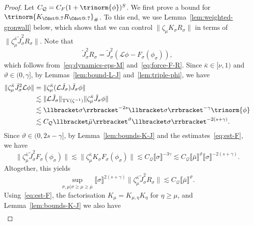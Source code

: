 \documentclass{article}
\makeatletter
\numberwithin{equation}{section}
\newcommand*\Cdot{{\mathpalette\Cdot@{.7}}}
\newcommand*\Cdot@[2]{\mathbin{\vcenter{\hbox{\scalebox{#2}{\hspace{0.1mm}$\m@th#1\bullet$\hspace{0.1mm}}}}}}
\theoremstyle{plain}
\theoremstyle{definition}
\makeatother
\begin{document}
\begin{proof}
  Let $C_{\mathcal{Q}} = C_F (1 + \trinorm{ \phi })^S$. We first
  prove a bound for $\trinorm{ K_{\Cdot} R_{\Cdot} }_{\#}$. To
  this end, we use Lemma~\ref{lem:weighted-gronwall} below, which shows that
  we can control $\| \zeta_{\mu} K_{\sigma} R_{\sigma} \|$ in terms of $\|
  \zeta_{\mu}^{\bar{\kappa}} \tilde{J}_{\sigma}^2 R_{\sigma} \|$. Note that
  \[ \tilde{J}_{\sigma}^2 R_{\sigma} = \tilde{J}_{\sigma}^2 (\mathcal{L} \phi
     - F_{\sigma} (\phi_{\sigma})), \]
  which follows from~\eqref{eq:dynamics-eps-M} and~\eqref{eq:force-F-R}. Since
  $\bar{\kappa} \in [\nu, 1)$ and $\vartheta \in (0, \gamma]$, by
  Lemmas~\ref{lem:bound-L-J} and~\ref{lem:triple-phi}, we have
  \begin{align*}
    \| \zeta_{\mu}^{\bar{\kappa}} \tilde{J}_{\sigma}^2
    \mathcal{L} \phi \|
    &= \| \zeta_{\mu}^{\bar{\kappa}}
    (\mathcal{L} \tilde{J}_{\sigma})
    \tilde{J}_{\sigma} \phi \|\\
    &\lesssim \| \mathcal{L} \tilde{J}_{\sigma}
    \|_{\operatorname{TV}(\zeta^{- 1})}
    \| \zeta_{\mu}^{\bar{\kappa}}
    \tilde{J}_{\sigma} \phi \|\\
    &\lesssim \llbracket \sigma \rrbracket^{- 2 s}
    \llbracket \sigma \rrbracket^{- \gamma}
    \trinorm{ \phi }\\
    &\lesssim C_{\mathcal{Q}}
    \llbracket \bar{\mu} \rrbracket^{\vartheta}
    \llbracket \sigma \rrbracket^{- 2 (s + \gamma)} .
  \end{align*}
  Since $\vartheta \in (0, 2 s - \gamma]$, by Lemma~\ref{lem:bounds-K-J} and
  the estimates~\eqref{eq:est-F}, we have
  \[ \| \zeta_{\mu}^{\bar{\kappa}} \tilde{J}_{\sigma}^2 F_{\sigma}
     (\phi_{\sigma}) \| \lesssim \| \zeta_{\mu}^{\bar{\kappa}} K_{\sigma}
     F_{\sigma} (\phi_{\sigma}) \| \lesssim C_{\mathcal{Q}} \llbracket \sigma
     \rrbracket^{- 3 \gamma} \lesssim C_{\mathcal{Q}} \llbracket \bar{\mu}
     \rrbracket^{\vartheta} \llbracket \sigma \rrbracket^{- 2 (s + \gamma)} .
  \]
  Altogether, this yields
  \begin{equation}
    \sup_{\sigma, \mu | \sigma \geqslant \mu \geqslant \bar{\mu}} \llbracket
    \sigma \rrbracket^{2 (s + \gamma)} \| \zeta_{\mu}^{\bar{\kappa}}
    \tilde{J}_{\sigma}^2 R_{\sigma} \| \lesssim C_{\mathcal{Q}} \llbracket
    \bar{\mu} \rrbracket^{\vartheta} . \label{eq:J-R-bound}
  \end{equation}
  Using~\eqref{eq:est-F}, the factorisation
  $K_{\mu} = K_{\mu, \eta} K_{\eta}$ for $\eta \geqslant \mu$, and
  Lemma~\ref{lem:bounds-K-J} we also have
  \[ \begin{aligned}

\end{aligned}\]
\end{proof}
\end{document}
